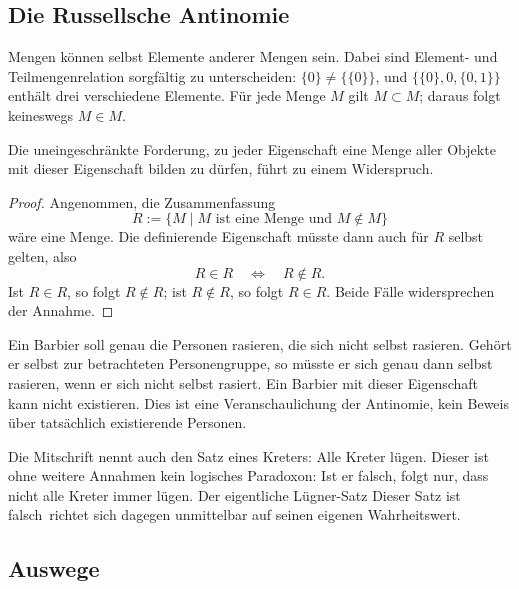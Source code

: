 \subsection{Die Russellsche Antinomie}

Mengen können selbst Elemente anderer Mengen sein. Dabei sind
Element- und Teilmengenrelation sorgfältig zu unterscheiden:
$\{0\}\ne\{\{0\}\}$, und
$\{\{0\},0,\{0,1\}\}$ enthält drei verschiedene Elemente.
Für jede Menge $M$ gilt $M\subset M$; daraus folgt keineswegs $M\in M$.

\begin{satz}
Die uneingeschränkte Forderung, zu jeder Eigenschaft eine Menge aller
Objekte mit dieser Eigenschaft bilden zu dürfen, führt zu einem Widerspruch.
\end{satz}
\begin{proof}
Angenommen, die Zusammenfassung
\[
    R:=\{M\mid M\text{ ist eine Menge und }M\notin M\}
\]
wäre eine Menge. Die definierende Eigenschaft müsste dann auch für $R$
selbst gelten, also
\[
    R\in R\quad\Longleftrightarrow\quad R\notin R.
\]
Ist $R\in R$, so folgt $R\notin R$; ist $R\notin R$, so folgt $R\in R$.
Beide Fälle widersprechen der Annahme.
\end{proof}

\begin{beispiel}
Ein Barbier soll genau die Personen rasieren, die sich nicht selbst rasieren.
Gehört er selbst zur betrachteten Personengruppe, so müsste er sich genau
dann selbst rasieren, wenn er sich nicht selbst rasiert. Ein Barbier mit
dieser Eigenschaft kann nicht existieren. Dies ist eine Veranschaulichung
der Antinomie, kein Beweis über tatsächlich existierende Personen.
\end{beispiel}

\begin{bemerkung}
Die Mitschrift nennt auch den Satz eines Kreters: \glqq Alle Kreter
lügen\grqq. Dieser ist ohne weitere Annahmen kein logisches Paradoxon:
Ist er falsch, folgt nur, dass nicht alle Kreter immer lügen.
Der eigentliche Lügner-Satz \glqq Dieser Satz ist falsch\grqq\ richtet
sich dagegen unmittelbar auf seinen eigenen Wahrheitswert.
\end{bemerkung}

\subsection{Auswege}

